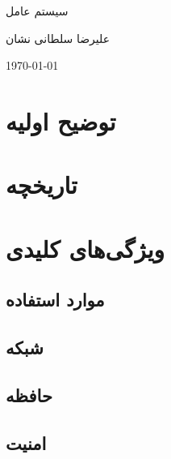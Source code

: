 \documentclass[20pt, a4paper]{article}
\begin{document}
\centerline{سیستم عامل }
\centerline{علیرضا سلطانی نشان}
\centerline{\today}

\tableofcontents

\section{توضیح اولیه}

\section{تاریخچه}

\section{ویژگی‌های کلیدی}

\subsection{موارد استفاده}

\subsection{شبکه}

\subsection{حافظه}

\subsection{امنیت}
\end{document}
